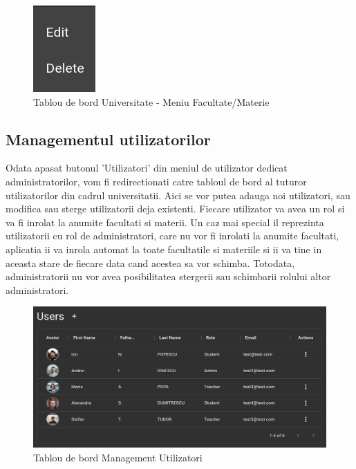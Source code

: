 \documentclass[12pt, a4paper, oneside, romanian]{teza-upb}
\begin{document}
\begin{figure}[H]
\centering
\includegraphics*[width=0.15\columnwidth]{tablou-de-bord-universitate-meniu-facultate}
\caption{Tablou de bord Universitate - Meniu Facultate/Materie}
\label{tablou-de-bord-universitate-meniu-facultate}
\end{figure}

\subsection{Managementul utilizatorilor}

Odata apasat butonul 'Utilizatori' din meniul de utilizator dedicat administratorilor, vom fi redirectionati catre tabloul de bord al tuturor utilizatorilor din cadrul universitatii. Aici se vor putea adauga noi utilizatori, sau modifica sau sterge utilizatorii deja existenti. Fiecare utilizator va avea un rol si va fi inrolat la anumite facultati si materii. Un caz mai special il reprezinta utilizatorii cu rol de administratori, care nu vor fi inrolati la anumite facultati, aplicatia ii va inrola automat la toate facultatile si materiile si ii va tine in aceasta stare de fiecare data cand acestea sa vor schimba. Totodata, administratorii nu vor avea posibilitatea stergerii sau schimbarii rolului altor administratori.

\begin{figure}[H]
\centering
\includegraphics*[width=\columnwidth]{tablou-de-bord-management-utilizatori}
\caption{Tablou de bord Management Utilizatori}
\label{tablou-de-bord-management-utilizatori}
\end{figure}
\end{document}

